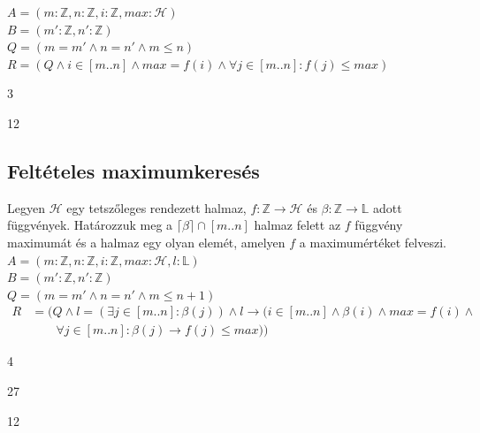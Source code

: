 \documentclass[a4paper,12pt]{article}
\newcommand{\lv}{{:}}
\begin{document}
$A = (m\lv\mathbb{Z}, n\lv\mathbb{Z}, i\lv\mathbb{Z}, max\lv\mathcal{H})$\\[2pt]
$B = (m'\lv\mathbb{Z}, n'\lv\mathbb{Z})$\\[2pt]
$Q = (m = m' \land n = n' \land m \leqslant n)$\\[2pt]
$R = (Q \land i \in [m..n] \land max = f(i) \land \forall j \in [m..n]\colon f(j) \leqslant max)$
\medskip
\begin{stuki}
  \begin{WHILE}{3}{}
  	\begin{CASE}{1}{2}
  	\end{CASE}
  \end{WHILE}
\end{stuki}

\subsection{Feltételes maximumkeresés}
Legyen $\mathcal{H}$ egy tetszőleges rendezett halmaz, $f\colon \mathbb{Z}\rightarrow\mathcal{H}$ és $\beta\colon \mathbb{Z}\rightarrow\mathbb{L}$ adott függvények. Határozzuk meg a $\lceil\beta\rceil \cap [m..n]$ halmaz felett az $f$ függvény maximumát és a halmaz egy olyan elemét, amelyen $f$ a maximumértéket felveszi.\\

$A = (m\lv\mathbb{Z}, n\lv\mathbb{Z}, i\lv\mathbb{Z}, max\lv\mathcal{H}, l\lv\mathbb{L})$\\[2pt]
$B = (m'\lv\mathbb{Z}, n'\lv\mathbb{Z})$\\[2pt]
$Q = (m = m' \land n = n' \land m \leqslant n+1)$\\[2pt]
$\begin{aligned}
R& = (Q \land l = (\exists j\in [m..n]\colon \beta(j)) \land l \rightarrow (i \in [m..n] \land \beta(i) \land max = f(i) \land\\
 &\quad\quad\forall j \in [m..n]\colon \beta(j) \rightarrow f(j) \leqslant max))
\end{aligned}$
\medskip
\begin{stuki}[17cm]
  \begin{WHILE}{4}{}
    \begin{CASE}{2}{7}
  	    \begin{CASE}{1}{2}
        \end{CASE}			
      \end{CASE}
	\end{WHILE}
\end{stuki}
\end{document}
